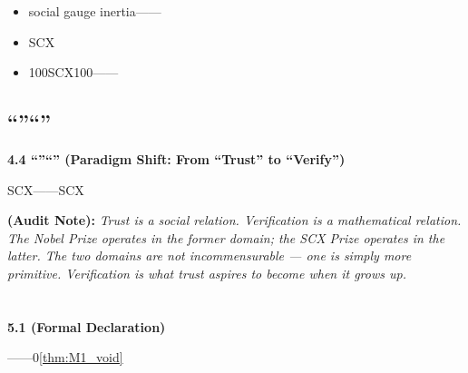 \documentclass[12pt,a4paper]{article}
\theoremstyle{remark}
\newenvironment{honestbox}{%
    \medskip\noindent
    \color{red}
    \begin{minipage}{0.92\textwidth}
    \textbf{}
    \begin{itemize}[leftmargin=*]
}{%
    \end{itemize}
    \end{minipage}
    \medskip
}
\newcommand{\auditnote}[1]{%
    \medskip\noindent
    \textbf{ (Audit Note):} \textit{#1}%
}
\begin{document}
\begin{honestbox}
    \item \textbf{}social gauge inertia——
    \item SCX
    \item 100SCX100——
\end{honestbox}

\subsection{``''``''}

\noindent
\textbf{4.4 ``''``'' (Paradigm Shift: From ``Trust'' to ``Verify'')}

\textit{}SCX\textit{}——SCX

\auditnote{Trust is a social relation. Verification is a mathematical relation. The Nobel Prize operates in the former domain; the SCX Prize operates in the latter. The two domains are not incommensurable — one is simply more primitive. Verification is what trust aspires to become when it grows up.}

\newpage

\section{}
\label{sec:declaration}

\subsection{}

\noindent
\textbf{5.1  (Formal Declaration)}

——0\ref{thm:M1_void}

\bigskip
\end{document}
